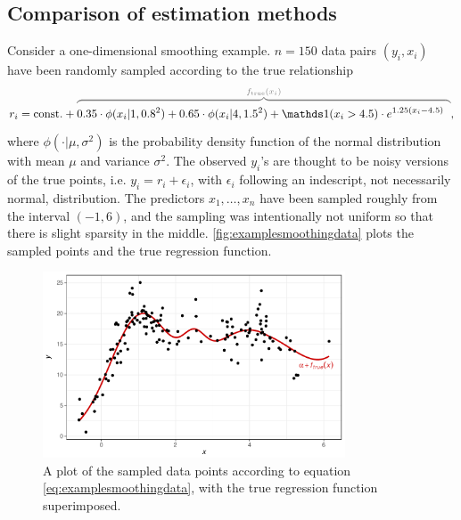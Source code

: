 \subsection{Comparison of estimation methods}
\label{sec:compareestimation}

Consider a one-dimensional smoothing example.
$n=150$ data pairs $(y_i,x_i)$ have been randomly sampled according to the true relationship 
\begin{align}\label{eq:examplesmoothingdata}
  \begin{gathered}
    r_i = \const + \myoverbrace{
    0.35 \cdot \phi(x_i|1,0.8^2) + 0.65 \cdot \phi(x_i|4,1.5^2)
    + \ind(x_i > 4.5)\cdot e^{1.25(x_i-4.5)}\phantom{\Big)}
    }{f_\text{true}(x_i)},
  \end{gathered}
\end{align}
where $\phi(\cdot|\mu,\sigma^2)$ is the probability density function of the normal distribution with mean $\mu$ and variance $\sigma^2$.
The observed $y_i$'s are thought to be noisy versions of the true points, i.e. $y_i = r_i + \epsilon_i$, with $\epsilon_i$ following an indescript, not necessarily normal, distribution.
The predictors $x_1,\dots,x_n$ have been sampled roughly from the interval $(-1,6)$, and the sampling was intentionally not uniform so that there is slight sparsity in the middle.
\autoref{fig:examplesmoothingdata} plots the sampled points and the true regression function.

\begin{figure}[hbt]
  \centering
  \includegraphics[width=0.8\textwidth]{figure/04-example_data}
  \caption{A plot of the sampled data points according to equation \eqref{eq:examplesmoothingdata}, with the true regression function superimposed.}
  \label{fig:examplesmoothingdata}
\end{figure}

